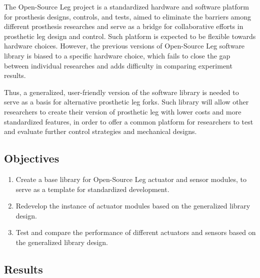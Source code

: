 \documentclass[12pt]{article}
\begin{document}


The Open-Source Leg project is a standardized hardware and software platform for prosthesis designs, controls, and tests, aimed to eliminate the barriers among different prosthesis researches and serve as a bridge for collaborative efforts in prosthetic leg design and control. Such platform is expected to be flexible towards hardware choices. However, the previous versions of Open-Source Leg software library is biased to a specific hardware choice, which fails to close the gap between individual researches and adds difficulty in comparing experiment results. 

Thus, a generalized, user-friendly version of the software library is needed to serve as a basis for alternative prosthetic leg forks. Such library will allow other researchers to create their version of prosthetic leg with lower costs and more standardized features, in order to offer a common platform for researchers to test and evaluate further control strategies and mechanical designs.


\subsection{Objectives}

\begin{enumerate}
    \item {Create a base library for Open-Source Leg actuator and sensor modules, to serve as a template for standardized development.}
    \item {Redevelop the instance of actuator modules based on the generalized library design.}
    \item {Test and compare the performance of different actuators and sensors based on the generalized library design.}
\end{enumerate}

\subsection{Results}
\end{document}
